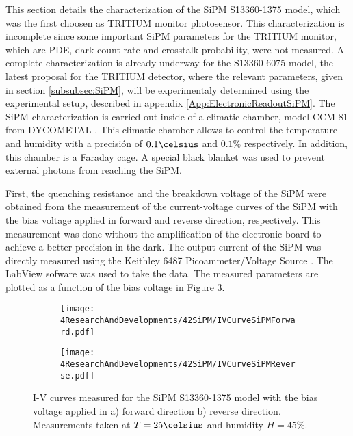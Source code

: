 This section details the characterization of the SiPM S13360-1375 model, which was the first choosen as TRITIUM monitor photosensor. This characterization is incomplete since some important SiPM parameters for the TRITIUM monitor, which are PDE, dark count rate and crosstalk probability, were not measured. A complete characterization is already underway for the S13360-6075 model, the latest proposal for the TRITIUM detector, where the relevant parameters, given in section \ref{subsubsec:SiPM}, will be experimentaly determined using the experimental setup, described in appendix \ref{App:ElectronicReadoutSiPM}. The SiPM characterization is carried out inside of a climatic chamber, model CCM 81 from DYCOMETAL \cite{ClimaticChamberIFIMED}. This climatic chamber allows to control the temperature and humidity with a precisión of $0.1\celsius$ and $0.1\%$ respectively. In addition, this chamber is a Faraday cage. A special black blanket \cite{BlackBlancket} was used to prevent external photons from reaching the SiPM.

First, the quenching resistance and the breakdown voltage of the SiPM were obtained from the measurement of the current-voltage curves of the SiPM with the bias voltage applied in forward and reverse direction, respectively. This measurement was done without the amplification of the electronic board to achieve a better precision in the dark. The output current of the SiPM was directly measured using the Keithley 6487 Picoammeter/Voltage Source \cite{DataSheetKeithley6487}. The LabView sofware was used to take the data. The measured parameters are plotted as a function of the bias voltage in Figure \ref{fig:IVcurveSiPM}.

\begin{figure}
\centering
    \begin{subfigure}[b]{0.9\textwidth}
    \centering
    \texttt{[image: 4ResearchAndDevelopments/42SiPM/IVCurveSiPMForward.pdf]}  
    \caption{\label{subfig:IVcurveForward}}
    \end{subfigure}
    \hfill
    \begin{subfigure}[b]{0.9\textwidth}
    \centering
    \texttt{[image: 4ResearchAndDevelopments/42SiPM/IVCurveSiPMReverse.pdf]}  
    \caption{\label{subfig:IVcurveReverse}}
    \end{subfigure}
 \caption{I-V curves measured for the SiPM S13360-1375 model with the bias voltage applied in a) forward direction b) reverse direction. Measurements taken at $T=25\celsius$ and humidity $H=45\%$.}
 \label{fig:IVcurveSiPM}
\end{figure}

